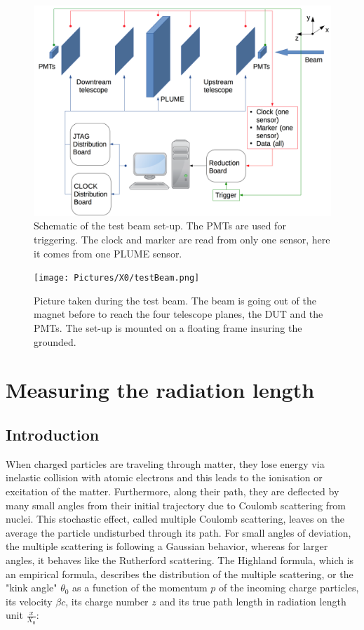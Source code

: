     \begin{figure}[!h]
      \centering
      \includegraphics[width = \textwidth]{Pictures/X0/testBeamAcquisition.png}
      \caption{Schematic of the test beam set-up. The PMTs are used for triggering. The clock and marker are read from only one sensor, here it comes from one PLUME sensor.}
      \label{fig:testBeamAcq}
    \end{figure}

    \begin{figure}
      \centering
      \texttt{[image: Pictures/X0/testBeam.png]}
      \caption{Picture taken during the test beam. The beam is going out of the magnet before to reach the four telescope planes, the DUT and the PMTs. The set-up is mounted on a floating frame insuring the grounded.}
      \label{fig:testBeam}
    \end{figure}

   
  \section{Measuring the radiation length}

    \subsection{Introduction}
    
    When charged particles are traveling through matter, they lose energy via inelastic collision with atomic electrons and this leads to the ionisation or excitation of the matter.
    Furthermore, along their path, they are deflected by many small angles from their initial trajectory due to Coulomb scattering from nuclei. 
    This stochastic effect, called multiple Coulomb scattering, leaves on the average the particle undisturbed through its path. 
    For small angles of deviation, the multiple scattering is following a Gaussian behavior, whereas for larger angles, it behaves like the Rutherford scattering.
    The Highland formula, which is an empirical formula, describes the distribution of the multiple scattering, or the "kink angle" $\theta_0$ as a function of the momentum $p$ of the incoming charge particles, its velocity $\beta c$, its charge number $z$ and its true path length in radiation length unit $\frac{x}{X_{0}}$:

